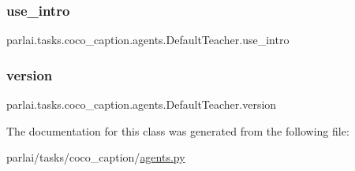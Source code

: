 \subsubsection{\texorpdfstring{use\+\_\+intro}{use\_intro}}
{\footnotesize\ttfamily parlai.\+tasks.\+coco\+\_\+caption.\+agents.\+Default\+Teacher.\+use\+\_\+intro}

\mbox{\label{classparlai_1_1tasks_1_1coco__caption_1_1agents_1_1DefaultTeacher_a5945ea0eff083c797fa85d1174c1a2e3}} 
\subsubsection{\texorpdfstring{version}{version}}
{\footnotesize\ttfamily parlai.\+tasks.\+coco\+\_\+caption.\+agents.\+Default\+Teacher.\+version}



The documentation for this class was generated from the following file\+:\begin{DoxyCompactItemize}
\item 
parlai/tasks/coco\+\_\+caption/\hyperlink{parlai_2tasks_2coco__caption_2agents_8py}{agents.\+py}\end{DoxyCompactItemize}
